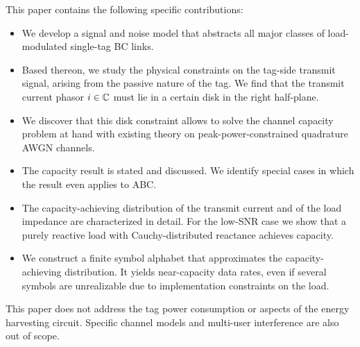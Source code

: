 This paper contains the following specific contributions:
\begin{itemize}
\item We develop a signal and noise model that abstracts all major classes of load-modulated single-tag BC links.
\item Based thereon, we study the physical constraints on the tag-side transmit signal, arising from the passive nature of the tag. We find that the transmit current phasor $i \in \mathbb{C}$ must lie in a certain disk in the right half-plane. %
\item We discover that this disk constraint allows to solve the channel capacity problem at hand with existing theory on peak-power-constrained quadrature AWGN channels.
\item The capacity result is stated and discussed. We identify special cases in which the result even applies to ABC.
\item The capacity-achieving distribution of the transmit current and of the load impedance are characterized in detail. For the low-SNR case we show that a purely reactive load with Cauchy-distributed reactance achieves capacity.
\item We construct a finite symbol alphabet that approximates the capacity-achieving distribution. It yields near-capacity data rates, even if several symbols are unrealizable due to implementation constraints on the load.
\end{itemize}

This paper does not address the tag power consumption or aspects of the energy harvesting circuit. Specific channel models and multi-user interference are also out of scope.



